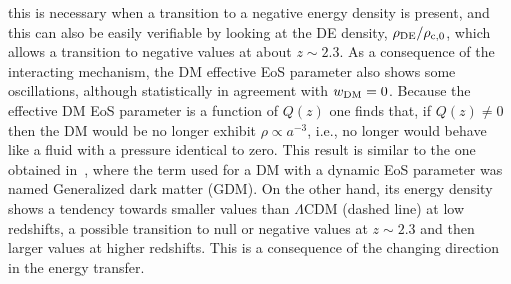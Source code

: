 \documentclass[twocolumn,a4paper,reprint,amssymb,aps,prd,groupedaddress,superscriptaddress,nofootinbib]{revtex4-2}
\begin{document}
this is necessary when a transition to a negative energy density is present, and this can
also be easily verifiable by looking at the DE density, $\rho_{\rm DE}/\rho_{\rm c,0}$, which
allows a transition to negative values at about $z\sim 2.3$.
%
As a consequence of the interacting mechanism, the DM effective EoS parameter also shows some
oscillations, although
statistically in agreement with $w_{\rm DM} = 0$.
%
Because the effective DM EoS parameter is a function of $Q(z)$ one finds that, if $Q(z) \neq 0$
then the DM would be no longer exhibit $\rho\propto a^{-3}$, i.e., no longer would behave like a fluid with
a pressure identical to zero. This result is similar
to the one obtained in~\cite{Kopp:2018zxp}, where the term used for a DM with a dynamic EoS parameter
was named Generalized dark matter (GDM).
On the other hand, its energy density shows a tendency towards smaller values than $\Lambda$CDM (dashed line) at
low redshifts, a possible transition to null or negative values at $z\sim 2.3$ and then larger
values at higher redshifts.
This is a consequence of the changing direction in the energy transfer.
\\
\end{document}
